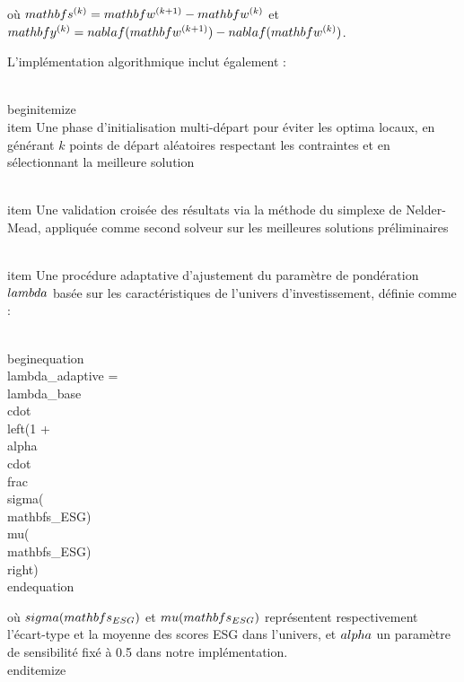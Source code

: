 où $\\mathbf{s}^{(k)} = \\mathbf{w}^{(k+1)} - \\mathbf{w}^{(k)}$ et $\\mathbf{y}^{(k)} = \\nabla f(\\mathbf{w}^{(k+1)}) - \\nabla f(\\mathbf{w}^{(k)})$.

L'implémentation algorithmique inclut également :

\\begin{itemize}
    \\item Une phase d'initialisation multi-départ pour éviter les optima locaux, en générant $k$ points de départ aléatoires respectant les contraintes et en sélectionnant la meilleure solution
    
    \\item Une validation croisée des résultats via la méthode du simplexe de Nelder-Mead, appliquée comme second solveur sur les meilleures solutions préliminaires
    
    \\item Une procédure adaptative d'ajustement du paramètre de pondération $\\lambda$ basée sur les caractéristiques de l'univers d'investissement, définie comme :
    
    \\begin{equation}
    \\lambda_{adaptive} = \\lambda_{base} \\cdot \\left(1 + \\alpha \\cdot \\frac{\\sigma(\\mathbf{s}_{ESG})}{\\mu(\\mathbf{s}_{ESG})}\\right)
    \\end{equation}
    
    où $\\sigma(\\mathbf{s}_{ESG})$ et $\\mu(\\mathbf{s}_{ESG})$ représentent respectivement l'écart-type et la moyenne des scores ESG dans l'univers, et $\\alpha$ un paramètre de sensibilité fixé à 0.5 dans notre implémentation.
\\end{itemize}

